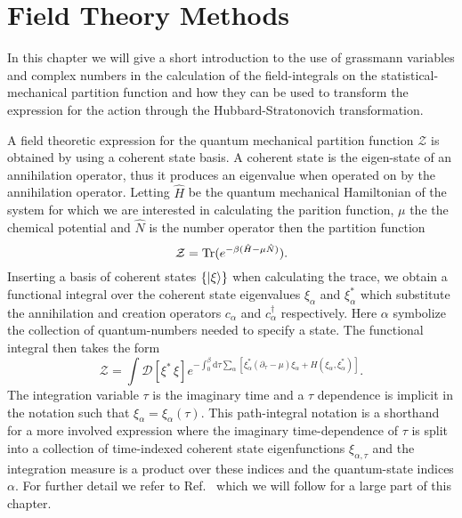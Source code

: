 \chapter{Field Theory Methods}

In this chapter we will give a short introduction to the use of grassmann variables
and complex numbers in the calculation of the field-integrals on the
statistical-mechanical partition function and how they can be used to transform the
expression for the action through the Hubbard-Stratonovich transformation.

A field theoretic expression for the quantum mechanical partition function $\mathcal{Z}$
is obtained by using a coherent state basis. A coherent state is the eigen-state of an annihilation operator, thus it
produces an eigenvalue when operated on by the annihilation operator. Letting $\hat{H}$ be the quantum mechanical
Hamiltonian of the system for which we are interested in calculating the parition function, $\mu$ the the chemical
potential and $\hat{N}$ is the number operator then the partition function
\begin{equation}
    \label{eq:Field:partitionFunction}
    \mathcal{Z} = \operatorname{Tr}(e^{-\beta(\hat{H}-\mu\hat{N})}).
\end{equation}
Inserting a basis of coherent states $\{\lvert \xi \rangle\}$ when calculating the trace, we obtain a functional integral over
the coherent state eigenvalues $\xi_\alpha$ and $\xi^\ast_\alpha$ which substitute the annihilation and creation operators
$c_\alpha$ and $c_\alpha^\dagger$ respectively. Here $\alpha$ symbolize the collection of quantum-numbers needed to specify
a state. The functional integral then takes the form
\begin{equation}
    \label{eq:Field:fieldPartition}
    \mathcal{Z} = \int\!\mathcal{D}[\xi^\ast\,\xi]e^{-\int_0^\beta\!\mathrm{d}\tau\sum_\alpha [\xi^\ast_\alpha(\partial_\tau-\mu)\xi_\alpha + H(\xi_\alpha,\xi_\alpha^\ast)]}.
\end{equation}
The integration variable $\tau$ is the imaginary time and a $\tau$ dependence is implicit in the notation such that $\xi_\alpha = \xi_\alpha(\tau)$.
This path-integral notation is a shorthand for a more involved expression where the imaginary time-dependence of $\tau$ is
split into a collection of time-indexed coherent state eigenfunctions $\xi_{\alpha,\tau}$ and the integration measure
is a product over these indices and the quantum-state indices $\alpha$. For further detail we refer to Ref.~\cite{NegeleOrland98}
which we will follow for a large part of this chapter.

